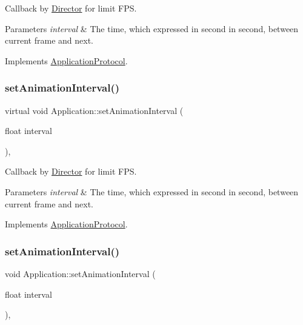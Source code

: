 Callback by \hyperlink{classDirector}{Director} for limit F\+PS. 


\begin{DoxyParams}{Parameters}
{\em interval} & The time, which expressed in second in second, between current frame and next. \\
\hline
\end{DoxyParams}


Implements \hyperlink{classApplicationProtocol_ac69ac0f01aaba7cc8654ec7cce4eb88f}{Application\+Protocol}.

\mbox{\label{classApplication_af04c472d3fac0d922d088896504925ac}} 
\subsubsection{\texorpdfstring{set\+Animation\+Interval()}{setAnimationInterval()}\hspace{0.1cm}{\footnotesize\ttfamily [6/12]}}
{\footnotesize\ttfamily virtual void Application\+::set\+Animation\+Interval (\begin{DoxyParamCaption}\item[{float}]{interval }\end{DoxyParamCaption})\hspace{0.3cm}{\ttfamily [override]}, {\ttfamily [virtual]}}



Callback by \hyperlink{classDirector}{Director} for limit F\+PS. 


\begin{DoxyParams}{Parameters}
{\em interval} & The time, which expressed in second in second, between current frame and next. \\
\hline
\end{DoxyParams}


Implements \hyperlink{classApplicationProtocol_ac69ac0f01aaba7cc8654ec7cce4eb88f}{Application\+Protocol}.

\mbox{\label{classApplication_a760516339314580f5086173d006483cc}} 
\subsubsection{\texorpdfstring{set\+Animation\+Interval()}{setAnimationInterval()}\hspace{0.1cm}{\footnotesize\ttfamily [7/12]}}
{\footnotesize\ttfamily void Application\+::set\+Animation\+Interval (\begin{DoxyParamCaption}\item[{float}]{interval }\end{DoxyParamCaption})\hspace{0.3cm}{\ttfamily [override]}, {\ttfamily [virtual]}}



